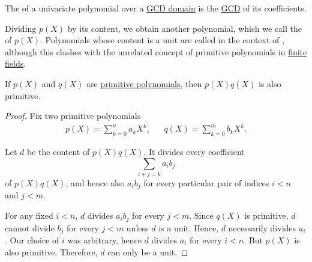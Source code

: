 \begin{definition}\label{def:polynomial_content}
  The  of a univariate polynomial over a \hyperref[def:gcd_domain]{GCD domain} is the \hyperref[def:gcd_and_lcm]{GCD} of its coefficients.

  Dividing \( p(X) \) by its content, we obtain another polynomial, which we call the  of \( p(X) \). Polynomials whose content is a unit are called  in the context of , although this clashes with the unrelated concept of primitive polynomials in \hyperref[thm:finite_fields]{finite fields}.
\end{definition}

\begin{lemma}\label{thm:gauss_lemma}
  If \( p(X) \) and \( q(X) \) are \hyperref[def:polynomial_content]{primitive polynomials}, then \( p(X) q(X) \) is also primitive.
\end{lemma}
\begin{proof}
  Fix two primitive polynomials
  \begin{align*}
    p(X) = \sum_{k=0}^n a_k X^k,
    &&
    q(X) = \sum_{k=0}^m b_k X^k.
  \end{align*}

  Let \( d \) be the content of \( p(X) q(X) \). It divides every coefficient
  \begin{equation*}
    \sum_{i+j=k} a_i b_j
  \end{equation*}
  of \( p(X) q(X) \), and hence also \( a_i b_j \) for every particular pair of indices \( i < n \) and \( j < m \).

  For any fixed \( i < n \), \( d \) divides \( a_i b_j \) for every \( j < m \). Since \( q(X) \) is primitive, \( d \) cannot divide \( b_j \) for every \( j < m \) unless \( d \) is a unit. Hence, \( d \) necessarily divides \( a_i \). Our choice of \( i \) was arbitrary, hence \( d \) divides \( a_i \) for every \( i < n \). But \( p(X) \) is also primitive. Therefore, \( d \) can only be a unit.
\end{proof}

